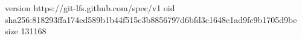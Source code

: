 version https://git-lfs.github.com/spec/v1
oid sha256:818293ffa174ed589b1b44f515c3b8856797d6bfd3c1648e1ad9fc9b1705d9be
size 131168
